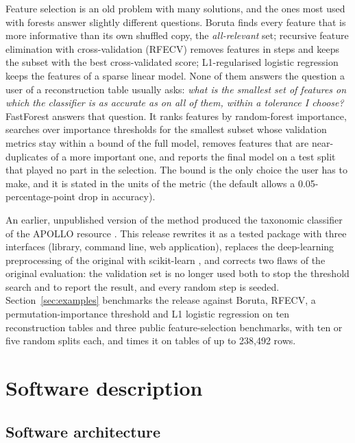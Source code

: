 \documentclass[11pt,a4paper]{article}
\begin{document}
Feature selection is an old problem with many solutions, and the ones most used with forests answer slightly different questions. Boruta \cite{kursa2010} finds every feature that is more informative than its own shuffled copy, the \emph{all-relevant} set; recursive feature elimination with cross-validation (RFECV) \cite{guyon2002} removes features in steps and keeps the subset with the best cross-validated score; L1-regularised logistic regression \cite{tibshirani1996} keeps the features of a sparse linear model. None of them answers the question a user of a reconstruction table usually asks: \emph{what is the smallest set of features on which the classifier is as accurate as on all of them, within a tolerance I choose?} FastForest answers that question. It ranks features by random-forest importance, searches over importance thresholds for the smallest subset whose validation metrics stay within a bound of the full model, removes features that are near-duplicates of a more important one, and reports the final model on a test split that played no part in the selection. The bound is the only choice the user has to make, and it is stated in the units of the metric (the default allows a 0.05-percentage-point drop in accuracy).

An earlier, unpublished version of the method produced the taxonomic classifier of the APOLLO resource \cite{heinken2025}. This release rewrites it as a tested package with three interfaces (library, command line, web application), replaces the deep-learning preprocessing of the original with scikit-learn \cite{pedregosa2011}, and corrects two flaws of the original evaluation: the validation set is no longer used both to stop the threshold search and to report the result, and every random step is seeded. Section~\ref{sec:examples} benchmarks the release against Boruta, RFECV, a permutation-importance threshold and L1 logistic regression on ten reconstruction tables and three public feature-selection benchmarks, with ten or five random splits each, and times it on tables of up to 238,492 rows.

\section{Software description}

\subsection{Software architecture}
\end{document}
